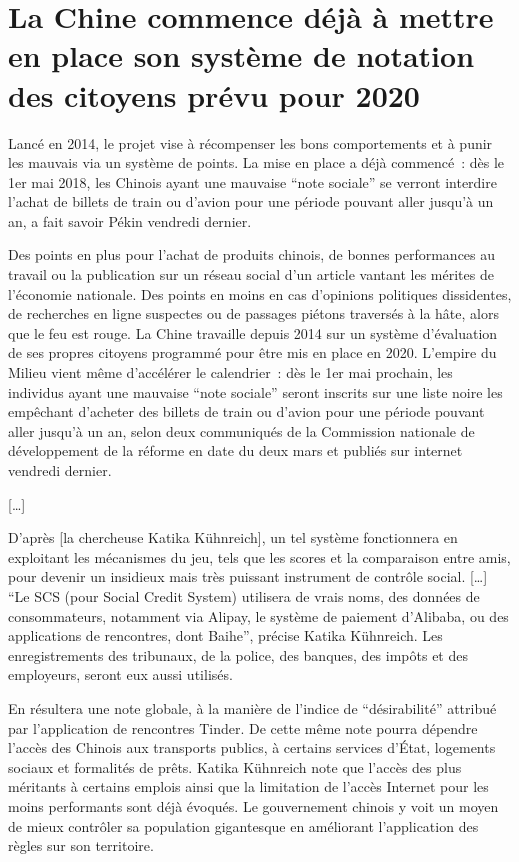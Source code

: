\section{La Chine commence déjà à mettre en place son système de notation des citoyens prévu pour 2020}

Lancé en 2014, le projet vise à récompenser les bons comportements et à punir les mauvais via un système de points. La mise en place a déjà commencé : dès le 1er mai 2018, les Chinois ayant une mauvaise \enquote{note sociale} se verront interdire l'achat de billets de train ou d'avion pour une période pouvant aller jusqu'à un an, a fait savoir Pékin vendredi dernier.

Des points en plus pour l'achat de produits chinois, de bonnes performances au travail ou la publication sur un réseau social d'un article vantant les mérites de l'économie nationale. Des points en moins en cas d'opinions politiques dissidentes, de recherches en ligne suspectes ou de passages piétons traversés à la hâte, alors que le feu est rouge. La Chine travaille depuis 2014 sur un système d'évaluation de ses propres citoyens programmé pour être mis en place en 2020. L'empire du Milieu vient même d'accélérer le calendrier : dès le 1er mai prochain, les individus ayant une mauvaise \enquote{note sociale} seront inscrits sur une liste noire les empêchant d'acheter des billets de train ou d'avion pour une période pouvant aller jusqu'à un an, selon deux communiqués de la Commission nationale de développement de la réforme en date du deux mars et publiés sur internet vendredi dernier.

[…]

D'après [la chercheuse Katika Kühnreich], un tel système fonctionnera en exploitant les mécanismes du jeu, tels que les scores et la comparaison entre amis, pour devenir un insidieux mais très puissant instrument de contrôle social. […] \enquote{Le SCS (pour Social Credit System) utilisera de vrais noms, des données de consommateurs, notamment via Alipay, le système de paiement d'Alibaba, ou des applications de rencontres, dont Baihe}, précise Katika Kühnreich. Les enregistrements des tribunaux, de la police, des banques, des impôts et des employeurs, seront eux aussi utilisés.

En résultera une note globale, à la manière de l'indice de \enquote{désirabilité} attribué par l'application de rencontres Tinder. De cette même note pourra dépendre l'accès des Chinois aux transports publics, à certains services d'État, logements sociaux et formalités de prêts. Katika Kühnreich note que l'accès des plus méritants à certains emplois ainsi que la limitation de l'accès Internet pour les moins performants sont déjà évoqués. Le gouvernement chinois y voit un moyen de mieux contrôler sa population gigantesque en améliorant l'application des règles sur son territoire.
